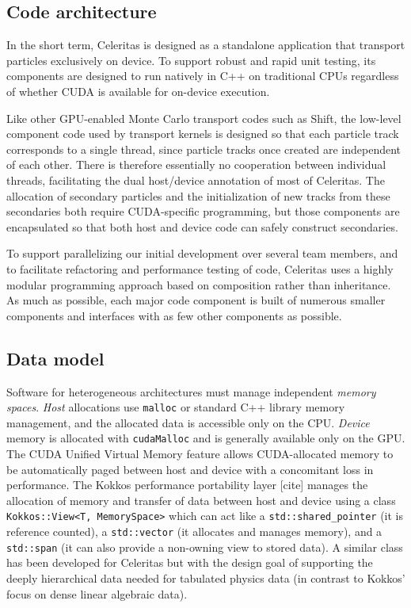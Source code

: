 \hypertarget{code-architecture}{%
\subsection{Code architecture}\label{code-architecture}}

In the short term, Celeritas is designed as a standalone application
that transport particles exclusively on device. To support robust and
rapid unit testing, its components are designed to run natively in C++
on traditional CPUs regardless of whether CUDA is available for
on-device execution.

Like other GPU-enabled Monte Carlo transport codes such as Shift, the
low-level component code used by transport kernels is designed so that
each particle track corresponds to a single thread, since particle
tracks once created are independent of each other. There is therefore
essentially no cooperation between individual threads, facilitating the
dual host/device annotation of most of Celeritas. The allocation of
secondary particles and the initialization of new tracks from these
secondaries both require CUDA-specific programming, but those components
are encapsulated so that both host and device code can safely construct
secondaries.

To support parallelizing our initial development over several team
members, and to facilitate refactoring and performance testing of code,
Celeritas uses a highly modular programming approach based on
composition rather than inheritance. As much as possible, each major
code component is built of numerous smaller components and interfaces
with as few other components as possible.

\hypertarget{data-model}{%
\subsection{Data model}\label{data-model}}

Software for heterogeneous architectures must manage independent
\emph{memory spaces}. \emph{Host} allocations use \texttt{malloc} or
standard C++ library memory management, and the allocated data is
accessible only on the CPU. \emph{Device} memory is allocated with
\texttt{cudaMalloc} and is generally available only on the GPU. The CUDA
Unified Virtual Memory feature allows CUDA-allocated memory to be
automatically paged between host and device with a concomitant loss in
performance. The Kokkos performance portability layer {[}cite{]} manages
the allocation of memory and transfer of data between host and device
using a class
\texttt{Kokkos::View\textless{}T,\ MemorySpace\textgreater{}} which can
act like a \texttt{std::shared\_pointer} (it is reference counted), a
\texttt{std::vector} (it allocates and manages memory), and a
\texttt{std::span} (it can also provide a non-owning view to stored
data). A similar class has been developed for Celeritas but with the
design goal of supporting the deeply hierarchical data needed for
tabulated physics data (in contrast to Kokkos' focus on dense linear
algebraic data).

